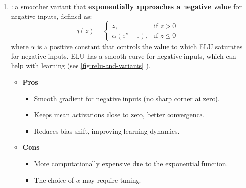 \begin{enumerate}
    \item {}: a smoother variant that \textbf{exponentially approaches a negative value} for negative inputs, defined as:
    \begin{equation}
        g\left(z\right) = \begin{cases}
            z, & \text{if } z > 0 \\
            \alpha \left(e^{z} - 1\right), & \text{if } z \leq 0
        \end{cases}
    \end{equation}
    where $\alpha$ is a positive constant that controls the value to which ELU saturates for negative inputs. ELU has a smooth curve for negative inputs, which can help with learning (see \autoref{fig:relu-and-variants} ).
    \begin{itemize}
        \item[\textcolor{Green3}{\faIcon{check-circle}}] \textcolor{Green3}{\textbf{Pros}}
        \begin{itemize}
            \item[\textcolor{Green3}{\faIcon{check}}] Smooth gradient for negative inputs (no sharp corner at zero).
            \item[\textcolor{Green3}{\faIcon{check}}] Keeps mean activations close to zero, better convergence.
            \item[\textcolor{Green3}{\faIcon{check}}] Reduces bias shift, improving learning dynamics.
        \end{itemize}
        \item[\textcolor{Red2}{\faIcon{times-circle}}] \textcolor{Red2}{\textbf{Cons}}
        \begin{itemize}
            \item[\textcolor{Red2}{\faIcon{times}}] More computationally expensive due to the exponential function.
            \item[\textcolor{Red2}{\faIcon{times}}] The choice of $\alpha$ may require tuning.
        \end{itemize}
    \end{itemize}



\end{enumerate}
